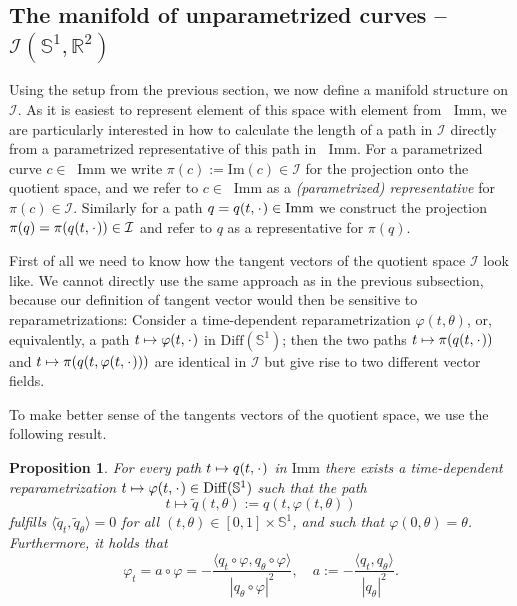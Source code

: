 \documentclass[a4,danish]{article}
\theoremstyle{break}
\newtheorem{proposition}[subsection]{Proposition}
\theoremstyle{definition}
\theoremstyle{Break}
\newcommand{\R}{\mathbb{R}}
\newcommand*\I{\mathop{}\!\mathrm{Imm}}
\renewcommand{\S}{\mathbb{S}}
\newcommand{\blank}{\makebox[1ex]{\textbf{$\cdot$}}}
\renewcommand{\phi}{\varphi}
\begin{document}
\subsection*{The manifold of unparametrized curves -- $\mathcal{I}(\S^1, \R^2)$}
\label{sec:manif-unpar-curv}

Using the setup from the previous section, we now define a manifold structure on $\mathcal{I}$. As it is easiest to represent element of this space with element from $\I$, we are particularly interested in how to calculate the length of a path in $\mathcal{I}$ directly from a parametrized representative of this path in $\I$. For a parametrized curve $c \in \I$ we write $\pi(c) := \mathrm{Im}(c)\in \mathcal{I}$ for the projection onto the quotient space, and we refer to $c\in\I$ as a \textit{(parametrized) representative} for $\pi(c) \in \mathcal{I}$. Similarly for a path $q = q(t, \blank) \in \I$ we construct the projection $\pi(q) = \pi(q(t,\blank)) \in \mathcal{I}$ and refer to $q$ as a representative for $\pi(q)$.

First of all we need to know how the tangent vectors of the quotient space $\mathcal{I}$ look like. We cannot directly use the same approach as in the previous subsection, because our definition of tangent vector would then be 
sensitive to reparametrizations: Consider a time-dependent
reparametrization $\phi(t,\theta)$, or, equivalently, a path $t \mapsto \phi(t,
\blank)$ in $\text{Diff}(\S^1)$; then the two paths $t \mapsto
\pi(q(t, \blank))$ and $t \mapsto \pi(q(t, \phi(t, \blank)))$ are
identical in $\mathcal{I}$ but give rise to two different vector fields.

To make better sense of the tangents vectors of the quotient space, we
use the following result.

\begin{proposition}
  \label{prop:horizontal-path}
  For every path $t \mapsto q(t, \blank)$ in $\mathrm{Imm}$ there exists a
  time-dependent reparametrization $t \mapsto \phi(t, \blank) \in
  \mathrm{Diff}(\S^{1})$ such that the path
  \begin{equation*}
    t \mapsto \tilde{q}(t, \theta):=q(t, \phi(t,\theta))
  \end{equation*}
  fulfills
  $\langle \tilde{q}_t, \tilde{q}_{\theta}\rangle=0$ for all $(t,\theta) \in [0,1]\times \S^1$, and such that $\phi(0, \theta)=\theta$. Furthermore, it holds that 
  \begin{equation}
    \label{eq:canon-repar}
    \phi_t = a \circ \phi
    = -\frac{\langle q_t \circ \phi, q_{\theta} \circ \phi\rangle}{|q_{\theta}\circ \phi|^2},
    \quad a := -\frac{\langle q_t,
      q_{\theta}\rangle}{|q_{\theta}|^2}.
  \end{equation}
\end{proposition}
\end{document}
